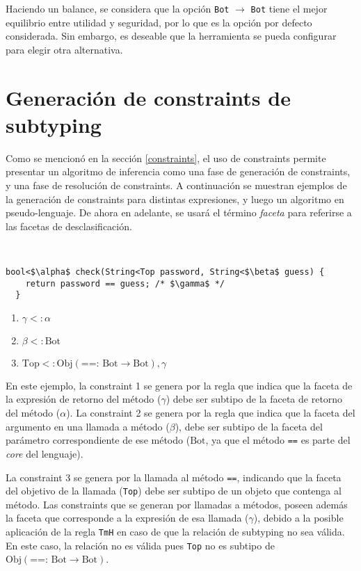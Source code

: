Haciendo un balance, se considera que la opción \texttt{Bot} $\rightarrow$ \texttt{Bot} tiene el mejor equilibrio entre utilidad y seguridad, por lo que es la opción por defecto considerada. Sin embargo, es deseable que la herramienta se pueda configurar para elegir otra alternativa.

\section{Generación de constraints de subtyping} \label{propuestaGen}
Como se mencionó en la sección \ref{constraints}, el uso de constraints permite presentar un algoritmo de inferencia como una fase de generación de constraints, y una fase de resolución de constraints. A continuación se muestran ejemplos de la generación de constraints para distintas expresiones, y luego un algoritmo en pseudo-lenguaje. De ahora en adelante, se usará el término \textit{faceta} para referirse a las facetas de desclasificación.

\begin{ej}\ \\
  \normalfont
  \label{gen1}
\begin{lstlisting}[mathescape=true]
  bool<$\alpha$ check(String<Top password, String<$\beta$ guess) {
    return password == guess; /* $\gamma$ */
  }
\end{lstlisting}

\begin{enumerate}
  \item $\gamma <: \alpha$
  \item $\beta <: \text{Bot}$
  \item $\text{Top} <: \text{Obj}(\text{==: }\text{Bot} \rightarrow \text{Bot}), \gamma$
\end{enumerate}
\end{ej}

En este ejemplo, la constraint 1 se genera por la regla que indica que la faceta de la expresión de retorno del método ($\gamma$) debe ser subtipo de la faceta de retorno del método ($\alpha$). La constraint 2 se genera por la regla que indica que la faceta del argumento en una llamada a método ($\beta$), debe ser subtipo de la faceta del parámetro correspondiente de ese método ($\text{Bot}$, ya que el método \texttt{==} es parte del \textit{core} del lenguaje).

La constraint 3 se genera por la llamada al método \texttt{==}, indicando que la faceta del objetivo de la llamada (\texttt{Top}) debe ser subtipo de un objeto que contenga al método. Las constraints que se generan por llamadas a métodos, poseen además la faceta que corresponde a la expresión de esa llamada ($\gamma$), debido a la posible aplicación de la regla \texttt{TmH} en caso de que la relación de subtyping no sea válida. En este caso, la relación no es válida pues \texttt{Top} no es subtipo de $\text{Obj}(\text{==: }\text{Bot} \rightarrow \text{Bot})$.

